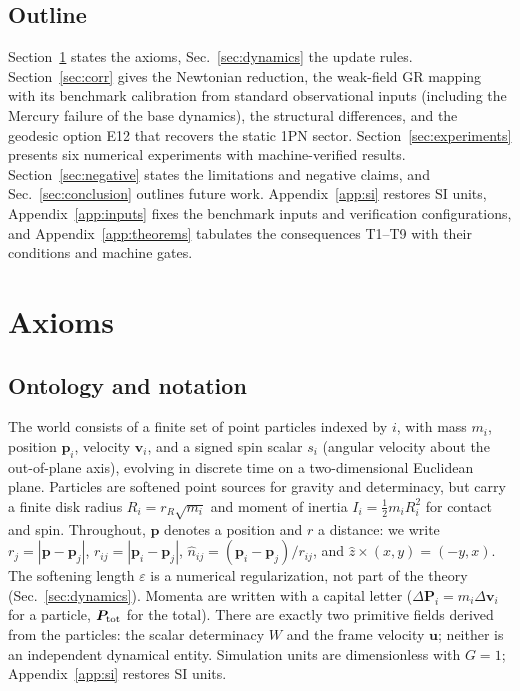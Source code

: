 \documentclass[aps,reprint,amsmath,amssymb,nofootinbib,superscriptaddress,floatfix]{revtex4-2}
\newcommand{\vect}[1]{\bm{#1}}
\begin{document}
\subsection{Outline}

Section~\ref{sec:axioms} states the axioms, Sec.~\ref{sec:dynamics} the
update rules.
Section~\ref{sec:corr} gives the Newtonian reduction, the weak-field GR
mapping with its benchmark calibration from standard observational
inputs (including the Mercury failure
of the base dynamics), the structural differences, and the geodesic
option E12 that recovers the static 1PN sector.
Section~\ref{sec:experiments} presents six numerical experiments with
machine-verified results.
Section~\ref{sec:negative} states the limitations and negative claims,
and Sec.~\ref{sec:conclusion} outlines future work.
Appendix~\ref{app:si} restores SI units,
Appendix~\ref{app:inputs} fixes the benchmark inputs and verification
configurations, and Appendix~\ref{app:theorems} tabulates the
consequences T1--T9 with their conditions and machine gates.

\section{Axioms}
\label{sec:axioms}

\subsection{Ontology and notation}

The world consists of a finite set of point particles indexed by $i$,
with mass
$m_i$, position $\vect{p}_i$, velocity $\vect{v}_i$, and a signed spin
scalar $s_i$ (angular velocity about the out-of-plane axis), evolving
in discrete time on a two-dimensional Euclidean plane.
Particles are softened point sources for gravity and determinacy, but
carry a finite disk radius $R_i = r_R\sqrt{m_i}$ and moment of
inertia $I_i = \tfrac{1}{2}m_iR_i^2$ for contact and spin.
Throughout, $\vect{p}$ denotes a position and $r$ a distance:
we write $r_j = |\vect{p}-\vect{p}_j|$,
$r_{ij} = |\vect{p}_i-\vect{p}_j|$,
$\hat{n}_{ij} = (\vect{p}_i-\vect{p}_j)/r_{ij}$, and
$\hat{z}\times(x,y) = (-y,x)$.
The softening length $\varepsilon$ is a numerical regularization, not
part of the theory (Sec.~\ref{sec:dynamics}).
Momenta are written with a capital letter ($\Delta\vect{P}_i =
m_i\Delta\vect{v}_i$ for a particle, $\vect{P}_{\rm tot}$ for the total).
There are exactly two primitive fields derived from the particles: the
scalar determinacy $W$ and the frame velocity $\vect{u}$; neither is an
independent dynamical entity.
Simulation units are dimensionless with $G = 1$; Appendix~\ref{app:si}
restores SI units.
\end{document}

